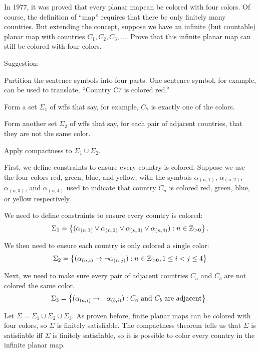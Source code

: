 \begin{problem}
  In 1977, it was proved that every planar mapcan be colored with four colors.
  Of course, the definition of ``map'' requires that
  there be only finitely many countries.
  But extending the concept, suppose we have an infinite
  (but countable) planar map with countries $C_1, C_2, C_3, \ldots$.
  Prove that this infinite planar map can still be colored with four colors.
  
  \step
  Suggestion:
  \begin{enumroman}
    \item Partition the sentence symbols into four parts.
    One sentence symbol, for example, can be used to translate,
    ``Country C7 is colored red.''
    \item
    Form a set $\Sigma_1$ of wffs that say, for example,
    $C_7$ is exactly one of the colors.
    
    \item
    Form another set $\Sigma_2$ of wffs that say,
    for each pair of adjacent countries, that they are not the same color.
    
    \item
    Apply compactness to $\Sigma_1 \cup \Sigma_2$.
  \end{enumroman}
\end{problem}

\begin{Answer}
  First, we define constraints to ensure every country is colored.
  Suppose we use the four colors red, green, blue, and yellow,
  with the symbols $\alpha_{(n, 1)}$, $\alpha_{(n, 2)}$, $\alpha_{(n, 3)}$, and $\alpha_{(n, 4)}$
  used to indicate that country $C_n$ is colored red, green, blue, or yellow
  respectively.
  
  \step
  We need to define constraints to ensure every country is colored:
  \[ \Sigma_1 = \left\{(\alpha_{(n, 1)} \lor \alpha_{(n, 2)} \lor \alpha_{(n, 3)} \lor \alpha_{(n, 4)}) : n \in \mathbb{Z}_{>0}\right\}. \]

  \step
  We then need to ensure each country is only colored a single color:
  \[ \Sigma_2 = \left\{(\alpha_{(n, i)} \to \lnot\alpha_{(n, j)}) : n \in \mathbb{Z}_{>0}, 1 \le i < j \le 4\right\}\]
  
  \step
  Next, we need to make sure every pair of adjacent countries $C_a$ and $C_b$
  are not colored the same color.
  \[ \Sigma_3 = \left\{(\alpha_{(a, i)} \to \lnot \alpha_{(b, i)}) : \text{$C_a$ and $C_b$ are adjacent}\right\}.\]

  \step
  Let $\Sigma = \Sigma_1 \cup \Sigma_2 \cup \Sigma_3$.
  As proven before, finite planar maps can be colored with four colors,
  so $\Sigma$ is finitely satisfiable.
  The compactness theorem tells us that $\Sigma$ is satisfiable iff $\Sigma$ is finitely satisfiable,
  so it is possible to color every country in the infinite planar map.

  
\end{Answer}

